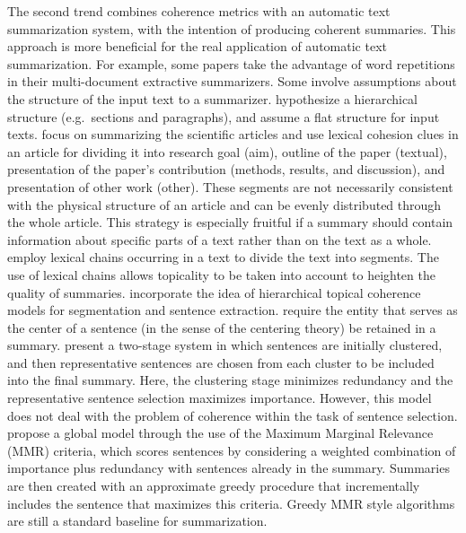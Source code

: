 The second trend combines coherence metrics with an automatic text summarization system, with the intention of producing coherent summaries.  
This approach is more beneficial for the real application of automatic text summarization. 
For example, some papers \cite{radev04a,nenkova05} take the advantage of word repetitions in their \mbox{multi-document} extractive summarizers. 
Some involve assumptions about the structure of the input text to a summarizer. 
 hypothesize a hierarchical structure (e.g.\ sections and paragraphs), and  assume a flat structure for input texts. 
 focus on summarizing the scientific articles and use lexical cohesion clues in an article for dividing it into research goal (aim), outline of the paper (textual), presentation of the paper's contribution (methods, results, and discussion), and presentation of other work (other). 
These segments are not necessarily consistent with the physical structure of an article and can be evenly distributed through the whole article. 
This strategy is especially fruitful if a summary should contain information about specific parts of a text rather than on the text as a whole.  
 employ lexical chains occurring in a text to divide the text into segments.  
The use of lexical chains allows topicality to be taken into account to heighten the quality of summaries.
 incorporate the idea of hierarchical topical coherence models for segmentation and sentence extraction. 
 require the entity that serves as the center of a sentence (in the sense of the centering theory) be retained in a summary. 
 present a \mbox{two-stage} system in which sentences are initially clustered, and then representative sentences are chosen from each cluster to be included into the final summary. 
Here, the clustering stage minimizes redundancy and the representative sentence selection maximizes importance.
However, this model does not deal with the problem of coherence within the task of sentence selection. 
 propose a global model through the use of the Maximum Marginal Relevance (MMR) criteria, which scores sentences by considering a weighted combination of importance plus redundancy with sentences already in the summary. 
Summaries are then created with an approximate greedy procedure that incrementally includes the sentence that maximizes this criteria. Greedy MMR style algorithms are still a standard baseline for summarization. 

